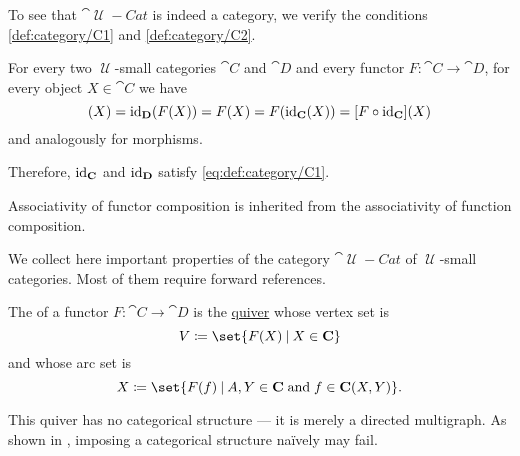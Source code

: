 \begin{defproof}
  To see that \( \cat{\mscrU-Cat} \) is indeed a category, we verify the conditions \ref{def:category/C1} and \ref{def:category/C2}.

   For every two \( \mscrU \)-small categories \( \cat{C} \) and \( \cat{D} \) and every functor \( F: \cat{C} \to \cat{D} \), for every object \( X \in \cat{C} \) we have
  \begin{equation*}
    [\id_{\cat{D}} \bincirc F](X)
    =
    \id_{\cat{D}}(F(X))
    =
    F(X)
    =
    F(\id_{\cat{C}}(X))
    =
    [F \bincirc \id_{\cat{C}}](X)
  \end{equation*}
  and analogously for morphisms.

  Therefore, \( \operatorname{id}_{\operatorname{\mathbf{C}}} \) and \( \operatorname{id}_{\operatorname{\mathbf{D}}} \) satisfy \eqref{eq:def:category/C1}.

   Associativity of functor composition is inherited from the associativity of function composition.
\end{defproof}

\begin{proposition}\label{thm:category_of_small_categories_properites}
  We collect here important properties of the category \hyperref[def:category_of_small_categories]{\( \cat{\mscrU-Cat} \)} of \( \mscrU \)-small categories. Most of them require forward references.
\end{proposition}

\begin{definition}\label{def:functor_image}
  The  of a functor \( F: \cat{C} \to \cat{D} \) is the \hyperref[def:quiver]{quiver} whose vertex set is
  \begin{equation*}
    V \coloneqq \set{ F(X) \given X \in \cat{C} }
  \end{equation*}
  and whose arc set is
  \begin{equation*}
    X \coloneqq \set{ F(f) \given A, Y \in \cat{C} \T{and} f \in \cat{C}(X, Y) }.
  \end{equation*}

  This quiver has no categorical structure --- it is merely a directed multigraph. As shown in , imposing a categorical structure na\"ively may fail.
\end{definition}

